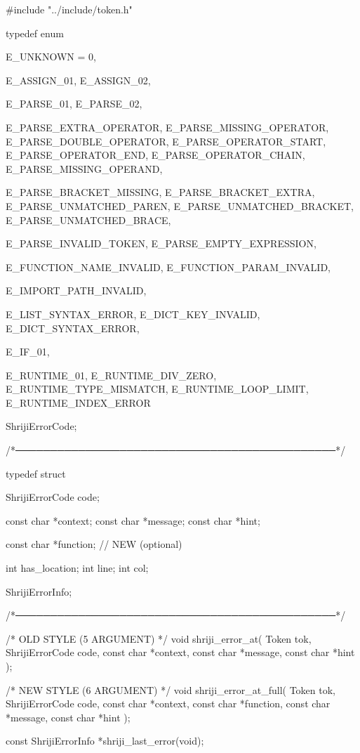 \documentclass{article}
\begin{document}
#include "../include/token.h"

typedef enum {

    E_UNKNOWN = 0,

    E_ASSIGN_01,
    E_ASSIGN_02,

    E_PARSE_01,
    E_PARSE_02,

    E_PARSE_EXTRA_OPERATOR,
    E_PARSE_MISSING_OPERATOR,
    E_PARSE_DOUBLE_OPERATOR,
    E_PARSE_OPERATOR_START,
    E_PARSE_OPERATOR_END,
    E_PARSE_OPERATOR_CHAIN,
    E_PARSE_MISSING_OPERAND,

    E_PARSE_BRACKET_MISSING,
    E_PARSE_BRACKET_EXTRA,
    E_PARSE_UNMATCHED_PAREN,
    E_PARSE_UNMATCHED_BRACKET,
    E_PARSE_UNMATCHED_BRACE,

    E_PARSE_INVALID_TOKEN,
    E_PARSE_EMPTY_EXPRESSION,

    E_FUNCTION_NAME_INVALID,
    E_FUNCTION_PARAM_INVALID,

    E_IMPORT_PATH_INVALID,

    E_LIST_SYNTAX_ERROR,
    E_DICT_KEY_INVALID,
    E_DICT_SYNTAX_ERROR,

    E_IF_01,

    E_RUNTIME_01,
    E_RUNTIME_DIV_ZERO,
    E_RUNTIME_TYPE_MISMATCH,
    E_RUNTIME_LOOP_LIMIT,
    E_RUNTIME_INDEX_ERROR

} ShrijiErrorCode;


/*──────────────────────────────────────────────*/

typedef struct {

    ShrijiErrorCode code;

    const char *context;
    const char *message;
    const char *hint;

    const char *function;   // NEW (optional)

    int has_location;
    int line;
    int col;

} ShrijiErrorInfo;


/*──────────────────────────────────────────────*/

/* OLD STYLE (5 ARGUMENT) */
void shriji_error_at(
    Token tok,
    ShrijiErrorCode code,
    const char *context,
    const char *message,
    const char *hint
);

/* NEW STYLE (6 ARGUMENT) */
void shriji_error_at_full(
    Token tok,
    ShrijiErrorCode code,
    const char *context,
    const char *function,
    const char *message,
    const char *hint
);

const ShrijiErrorInfo *shriji_last_error(void);
\end{document}
